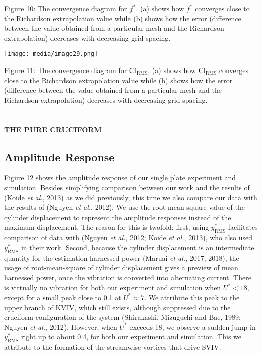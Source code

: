 \documentclass[]{article}
\begin{document}
\protect\hypertarget{_Toc41048833}{}{}Figure 10: The convergence diagram
for \(f^{*}\). (a) shows how \(f^{*}\) converges close to the Richardson
extrapolation value while (b) shows how the error (difference between
the value obtained from a particular mesh and the Richardson
extrapolation) decreases with decreasing grid spacing.

\texttt{[image: media/image29.png]}

\protect\hypertarget{_Toc41048834}{}{}Figure 11: The convergence diagram
for \(\text{Cl}_{\text{RMS}}\). (a) shows how \(\text{Cl}_{\text{RMS}}\)
converges close to the Richardson extrapolation value while (b) shows
how the error (difference between the value obtained from a particular
mesh and the Richardson extrapolation) decreases with decreasing grid
spacing.

\section{\texorpdfstring{\protect\hypertarget{_Toc461037268}{}{\protect\hypertarget{_Toc461037451}{}{\protect\hypertarget{_Toc41048809}{}{}}}}{}}\label{section-3}

\textbf{THE PURE CRUCIFORM}

\subsection{\texorpdfstring{\protect\hypertarget{_Toc41048810}{}{\protect\hypertarget{_Ref41049198}{}{}}Amplitude
Response}{Amplitude Response}}\label{amplitude-response}

Figure 12 shows the amplitude response of our single plate experiment
and simulation. Besides simplifying comparison between our work and the
results of (Koide \emph{et al.}, 2013) as we did previously, this time
we also compare our data with the results of (Nguyen \emph{et al.},
2012). We use the root-mean-square value of the cylinder displacement to
represent the amplitude responses instead of the maximum displacement.
The reason for this is twofold: first, using \(y_{\text{RMS}}^{*}\)
facilitates comparison of data with (Nguyen \emph{et al.}, 2012; Koide
\emph{et al.}, 2013), who also used \(y_{\text{RMS}}^{*}\) in their
work. Second, because the cylinder displacement is an intermediate
quantity for the estimation harnessed power (Maruai \emph{et al.}, 2017,
2018), the usage of root-mean-square of cylinder displacement gives a
preview of mean harnessed power, once the vibration is converted into
alternating current. There is virtually no vibration for both our
experiment and simulation when \(U^{*} < 18\), except for a small peak
close to 0.1 at \(U^{*} \approx 7\). We attribute this peak to the upper
branch of KVIV, which still exists, although suppressed due to the
cruciform configuration of the system (Shirakashi, Mizuguchi and Bae,
1989; Nguyen \emph{et al.}, 2012). However, when \(U^{*}\) exceeds 18,
we observe a sudden jump in \(y_{\text{RMS}}^{*}\) right up to about
0.4, for both our experiment and simulation. This we attribute to the
formation of the streamwise vortices that drive SVIV.
\end{document}
